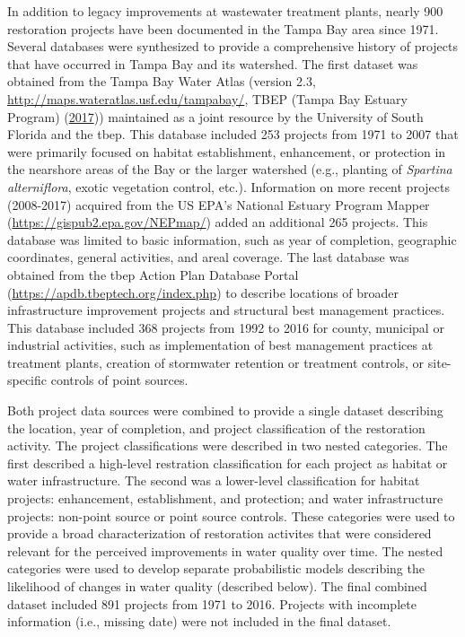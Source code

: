 \documentclass[]{article}
\begin{document}
In addition to legacy improvements at wastewater treatment plants,
nearly 900 restoration projects have been documented in the Tampa Bay
area since 1971. Several databases were synthesized to provide a
comprehensive history of projects that have occurred in Tampa Bay and
its watershed. The first dataset was obtained from the Tampa Bay Water
Atlas (version 2.3, \url{http://maps.wateratlas.usf.edu/tampabay/}, TBEP
(Tampa Bay Estuary Program) (\protect\hyperlink{ref-TBEP17}{2017}))
maintained as a joint resource by the University of South Florida and
the \ac{tbep}. This database included 253 projects from 1971 to 2007
that were primarily focused on habitat establishment, enhancement, or
protection in the nearshore areas of the Bay or the larger watershed
(e.g., planting of \emph{Spartina alterniflora}, exotic vegetation
control, etc.). Information on more recent projects (2008-2017) acquired
from the US EPA's National Estuary Program Mapper
(\url{https://gispub2.epa.gov/NEPmap/}) added an additional 265
projects. This database was limited to basic information, such as year
of completion, geographic coordinates, general activities, and areal
coverage. The last database was obtained from the \ac{tbep} Action Plan
Database Portal (\url{https://apdb.tbeptech.org/index.php}) to describe
locations of broader infrastructure improvement projects and structural
best management practices. This database included 368 projects from 1992
to 2016 for county, municipal or industrial activities, such as
implementation of best management practices at treatment plants,
creation of stormwater retention or treatment controls, or site-specific
controls of point sources.

Both project data sources were combined to provide a single dataset
describing the location, year of completion, and project classification
of the restoration activity. The project classifications were described
in two nested categories. The first described a high-level restration
classification for each project as habitat or water infrastructure. The
second was a lower-level classification for habitat projects:
enhancement, establishment, and protection; and water infrastructure
projects: non-point source or point source controls. These categories
were used to provide a broad characterization of restoration activites
that were considered relevant for the perceived improvements in water
quality over time. The nested categories were used to develop separate
probabilistic models describing the likelihood of changes in water
quality (described below). The final combined dataset included 891
projects from 1971 to 2016. Projects with incomplete information (i.e.,
missing date) were not included in the final dataset.
\end{document}
